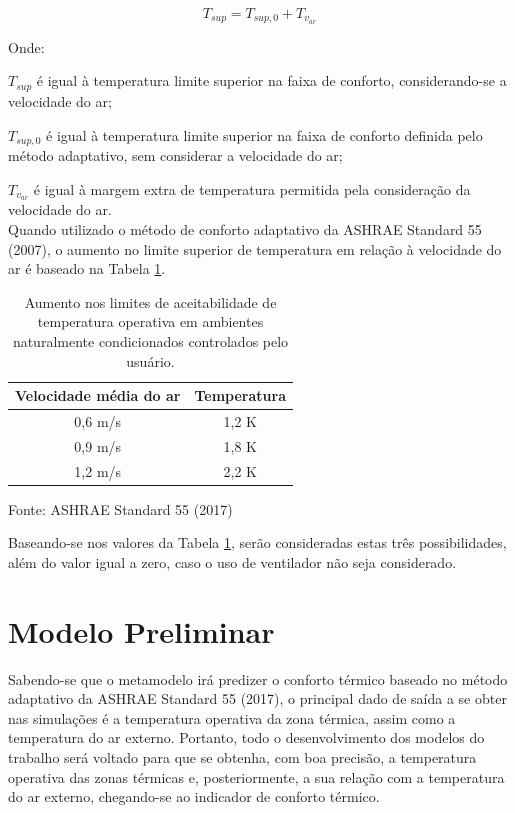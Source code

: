 \documentclass[brazil,hardcopy,openany,a5paper]{ufscthesis}
\begin{document}
		\begin{equation}
		\label{eq:Tsup}
		T_{sup} = T_{sup,0} + T_{v_{ar}}
		\end{equation}
		
		Onde:
		
		$T_{sup}$ é igual à temperatura limite superior na faixa de conforto, considerando-se a velocidade do ar;
		
		$T_{sup,0}$ é igual à temperatura limite superior na faixa de conforto definida pelo método adaptativo, sem considerar a velocidade do ar;
		
		$T_{v_{ar}}$ é igual à margem extra de temperatura permitida pela consideração da velocidade do ar.
		\\
		
		Quando utilizado o método de conforto adaptativo da ASHRAE Standard 55 (2007), o aumento no limite superior de temperatura em relação à velocidade do ar é baseado na Tabela \ref{table:var}.		
		
		\begin{table}[!h]
			\centering
			\caption{Aumento nos limites de aceitabilidade de temperatura operativa em ambientes naturalmente condicionados controlados pelo usuário.}
			\label{table:var}
			\begin{tabular}{|c |c |}
				\hline
				\textbf{Velocidade média do ar} & \textbf{Temperatura} \\
				\hline
				0,6 m/s & 1,2 K \\
				\hline
				0,9 m/s & 1,8 K \\
				\hline
				1,2 m/s & 2,2 K \\
				\hline 
			\end{tabular}
			\begin{flushleft}
			Fonte: ASHRAE Standard 55 (2017)
			\end{flushleft}				
		\end{table}
	
		Baseando-se nos valores da Tabela \ref{table:var}, serão consideradas estas três possibilidades, além do valor igual a zero, caso o uso de ventilador não seja considerado.
		
		\section{Modelo Preliminar}
		
		Sabendo-se que o metamodelo irá predizer o conforto térmico baseado no método adaptativo da ASHRAE Standard 55 (2017), o principal dado de saída a se obter nas simulações é a temperatura operativa da zona térmica, assim como a temperatura do ar externo. Portanto, todo o desenvolvimento dos modelos do trabalho será voltado para que se obtenha, com boa precisão, a temperatura operativa das zonas térmicas e, posteriormente, a sua relação com a temperatura do ar externo, chegando-se ao indicador de conforto térmico.
		
\end{document}
